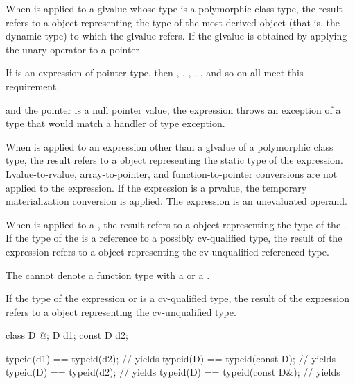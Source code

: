 \pnum
When  is applied to a glvalue whose type is a
polymorphic class type, the result refers to a
 object representing the type of the most derived
object (that is, the dynamic type) to which the
glvalue refers. If the glvalue is obtained by applying the
unary \tcode{*} operator to a pointer
\begin{footnote}
If  is an expression of
pointer type, then ,
, , , , and so on
all meet this requirement.
\end{footnote}
and the pointer is a null pointer value, the
 expression throws an exception of
a type that would match a handler of type
%
%
exception.

\pnum
When  is applied to an expression other than a glvalue of
a polymorphic class type, the result refers to a 
object representing the static type of the expression.
Lvalue-to-rvalue, array-to-pointer,
and function-to-pointer conversions are not applied to
the expression.
If the expression is a prvalue,
the temporary materialization conversion
is applied.
The expression is an unevaluated operand.

\pnum
When  is applied to a , the result
refers to a  object representing the type of the
. If the type of the  is a reference
to a possibly cv-qualified type, the result of the
 expression refers to a  object
representing the cv-unqualified referenced type.
\begin{note}
The  cannot denote a function type with
a  or a .
\end{note}

\pnum
If the type of the expression or  is a
cv-qualified type, the result of the  expression refers
to a  object representing the cv-unqualified
type.
\begin{example}
\begin{codeblock}
class D { @\commentellip@ };
D d1;
const D d2;

typeid(d1) == typeid(d2);       // yields 
typeid(D)  == typeid(const D);  // yields 
typeid(D)  == typeid(d2);       // yields 
typeid(D)  == typeid(const D&); // yields 
\end{codeblock}
\end{example}

